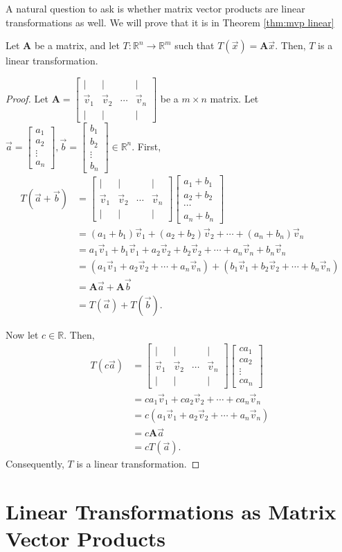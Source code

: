 \documentclass[]{book}
\newcommand{\vecxxdx}[1][x]{\ensuremath{\begin{bmatrix}
#1_1 \\
#1_2 \\
\vdots \\
#1_n
\end{bmatrix}}}
\newcommand{\vecn}[1]{\ensuremath{\vec{v}_{#1}}}
\newcommand{\mat}[1]{\ensuremath{\mathbf{#1}}}
\newcommand{\cmat}[1][v]{\begin{bmatrix}
        \vert & \vert & & \vert \\
        \vec{#1}_1 & \vec{#1}_2 & \cdots & \vec{#1}_n \\
        \vert & \vert & & \vert
    \end{bmatrix}
}
\newcommand{\R}{\ensuremath{\mathbb{R}}}
\begin{document}
A natural question to ask is whether matrix vector products are linear transformations as well. We will prove that it is in Theorem \ref{thm:mvp linear}
\begin{theorem}
    \label{thm:mvp linear}
    Let $\mat{A}$ be a matrix, and let $T:\R^n \to \R^m$ such that $T(\vec{x}) = \mat{A}\vec{x}$. Then, $T$ is a linear transformation.
\begin{proof}
    Let $\mat{A} = \cmat$ be a $m\times n$ matrix. Let $\vec{a}=\vecxxdx[a],\vec{b}=\vecxxdx[b] \in \R^n$. First,
    \begin{align*}
        T(\vec{a} + \vec{b}) &= \cmat \begin{bmatrix}a_1 + b_1 \\ a_2 + b_2 \\ \cdots \\ a_n + b_n\end{bmatrix} \\
        &= (a_1+b_1)\vecn{1} + (a_2+b_2)\vecn{2} + \cdots + (a_n+b_n)\vecn{n} \\
        &= a_1\vecn{1} + b_1\vecn{1} + a_2\vecn{2} + b_2\vecn{2} + \cdots + a_n\vecn{n} + b_n\vecn{n} \\
        &= (a_1\vecn{1} + a_2\vecn{2} + \cdots + a_n\vecn{n}) + (b_1\vecn{1} + b_2\vecn{2} + \cdots + b_n\vecn{n}) \\
        &= \mat{A} \vec{a} + \mat{A}\vec{b} \\
        &= T(\vec{a})+T(\vec{b}).
    \end{align*}
    
    Now let $c \in \mathbb{R}$. Then,
    \begin{align*}
        T(c\vec{a}) &= \cmat \vecxxdx[ca] \\
        &= ca_1\vecn{1} + ca_2\vecn{2} + \cdots + ca_n\vecn{n} \\ 
        &= c(a_1\vecn{1} + a_2\vecn{2} + \cdots + a_n\vecn{n}) \\
        &= c\mat{A}\vec{a} \\
        &= cT(\vec{a}).
    \end{align*}
    Consequently, $T$ is a linear transformation.
\end{proof}
\end{theorem}

\section{Linear Transformations as Matrix Vector Products}
\end{document}
